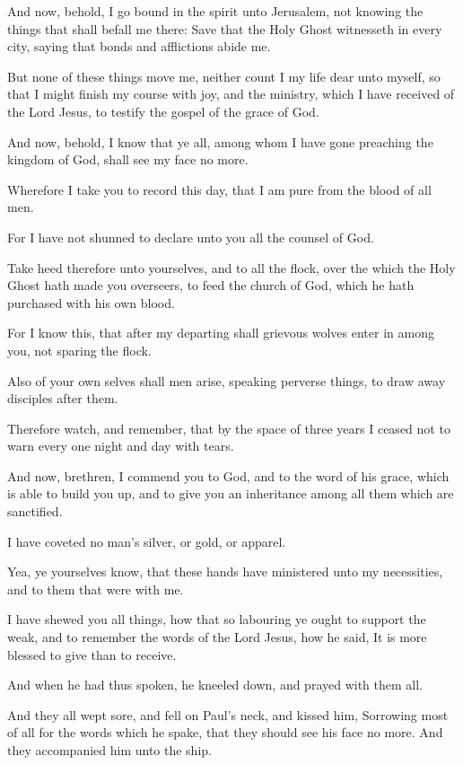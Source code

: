 \verse And now, behold, I go bound in the spirit unto Jerusalem, not knowing the things that shall befall me there: \verse Save that the Holy Ghost witnesseth in every city, saying that bonds and afflictions abide me.

\verse But none of these things move me, neither count I my life dear unto myself, so that I might finish my course with joy, and the ministry, which I have received of the Lord Jesus, to testify the gospel of the grace of God.

\verse And now, behold, I know that ye all, among whom I have gone preaching the kingdom of God, shall see my face no more.

\verse Wherefore I take you to record this day, that I am pure from the blood of all men.

\verse For I have not shunned to declare unto you all the counsel of God.

\verse Take heed therefore unto yourselves, and to all the flock, over the which the Holy Ghost hath made you overseers, to feed the church of God, which he hath purchased with his own blood.

\verse For I know this, that after my departing shall grievous wolves enter in among you, not sparing the flock.

\verse Also of your own selves shall men arise, speaking perverse things, to draw away disciples after them.

\verse Therefore watch, and remember, that by the space of three years I ceased not to warn every one night and day with tears.

\verse And now, brethren, I commend you to God, and to the word of his grace, which is able to build you up, and to give you an inheritance among all them which are sanctified.

\verse I have coveted no man's silver, or gold, or apparel.

\verse Yea, ye yourselves know, that these hands have ministered unto my necessities, and to them that were with me.

\verse I have shewed you all things, how that so labouring ye ought to support the weak, and to remember the words of the Lord Jesus, how he said, It is more blessed to give than to receive.

\verse And when he had thus spoken, he kneeled down, and prayed with them all.

\verse And they all wept sore, and fell on Paul's neck, and kissed him, \verse Sorrowing most of all for the words which he spake, that they should see his face no more. And they accompanied him unto the ship.


